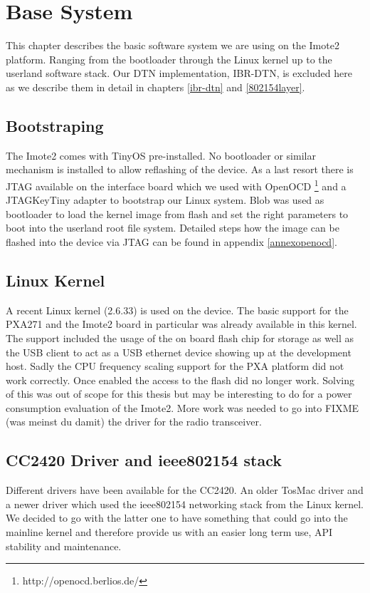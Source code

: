 \chapter{Base System}
This chapter describes the basic software system we are using on the Imote2
platform. Ranging from the bootloader through the Linux kernel up to the
userland software stack. Our DTN implementation, IBR-DTN, is excluded here as we
describe them in detail in chapters \ref{ibr-dtn} and \ref{802154layer}.

\section{Bootstraping}
The Imote2 comes with TinyOS pre-installed. No bootloader or similar mechanism
is installed to allow reflashing of the device. As a last resort there is JTAG
available on the interface board which we used  with OpenOCD
\footnote{http://openocd.berlios.de/} and a
JTAGKeyTiny adapter to bootstrap our Linux system. Blob was used as bootloader to
load the kernel image from flash and set the right parameters to boot into the
userland root file system. Detailed steps how the image can be flashed into the
device via JTAG can be found in appendix \ref{annexopenocd}.

\section{Linux Kernel}
A recent Linux kernel (2.6.33) is used on the device. The basic support for the
PXA271 and the Imote2 board in particular was already available in this kernel.
The support included the usage of the on board flash chip for storage as well as
the USB client to act as a USB ethernet device showing up at the development host.
Sadly the CPU frequency scaling support for the PXA platform did not work
correctly. Once enabled the access to the flash did no longer work.
Solving of this was out of scope for this thesis but may be interesting to do for a
power consumption evaluation of the Imote2. More work was needed to go into FIXME (was meinst du damit) the
driver for the radio transceiver.

\section{CC2420 Driver and ieee802154 stack}
Different drivers have been available for the CC2420. An older TosMac driver and
a newer driver which used the ieee802154 networking stack from the Linux kernel.
We decided to go with the latter one to have something that could go into the
mainline kernel and therefore provide us with an easier long term use, API
stability and maintenance.

